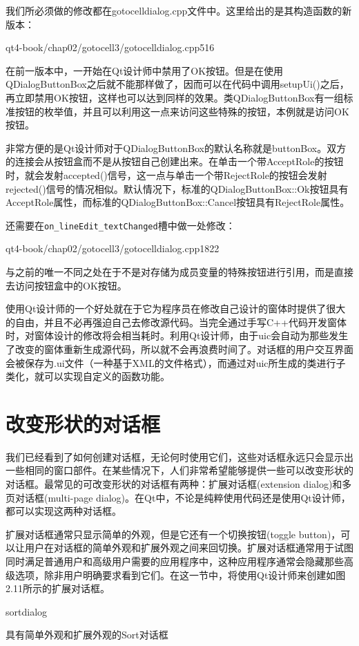 \documentclass[11pt,oneside]{book}
\begin{document}
\begin{common-format}
我们所必须做的修改都在gotocelldialog.cpp文件中。这里给出的是其构造函数的新版本：
\begin{cppline}[3]{qt4-book/chap02/gotocell3/gotocelldialog.cpp}{5}{16}
\end{cppline}

在前一版本中，一开始在Qt设计师中禁用了OK按钮。但是在使用QDialogButtonBox之后就不能那样做了，因而可以在代码中调用setupUi()之后，再立即禁用OK按钮，这样也可以达到同样的效果。类QDialogButtonBox有一组标准按钮的枚举值，并且可以利用这一点来访问这些特殊的按钮，本例就是访问OK按钮。

非常方便的是Qt设计师对于QDialogButtonBox的默认名称就是buttonBox。双方的连接会从按钮盒而不是从按钮自己创建出来。在单击一个带AcceptRole的按钮时，就会发射accepted()信号，这一点与单击一个带RejectRole的按钮会发射rejected()信号的情况相似。默认情况下，标准的QDialogButtonBox::Ok按钮具有AcceptRole属性，而标准的QDialogButtonBox::Cancel按钮具有RejectRole属性。

还需要在\verb+on_lineEdit_textChanged+槽中做一处修改：
\begin{cppline}[13]{qt4-book/chap02/gotocell3/gotocelldialog.cpp}{18}{22}
\end{cppline}

与之前的唯一不同之处在于不是对存储为成员变量的特殊按钮进行引用，而是直接去访问按钮盒中的OK按钮。

使用Qt设计师的一个好处就在于它为程序员在修改自己设计的窗体时提供了很大的自由，并且不必再强迫自己去修改源代码。当完全通过手写C++代码开发窗体时，对窗体设计的修改将会相当耗时。利用Qt设计师，由于uic会自动为那些发生了改变的窗体重新生成源代码，所以就不会再浪费时间了。对话框的用户交互界面会被保存为.ui文件（一种基于XML的文件格式），而通过对uic所生成的类进行子类化，就可以实现自定义的函数功能。

\section{改变形状的对话框}
我们已经看到了如何创建对话框，无论何时使用它们，这些对话框永远只会显示出一些相同的窗口部件。在某些情况下，人们非常希望能够提供一些可以改变形状的对话框。最常见的可改变形状的对话框有两种：扩展对话框(extension dialog)和多页对话框(multi-page dialog)。在Qt中，不论是纯粹使用代码还是使用Qt设计师，都可以实现这两种对话框。

扩展对话框通常只显示简单的外观，但是它还有一个切换按钮(toggle button)，可以让用户在对话框的简单外观和扩展外观之间来回切换。扩展对话框通常用于试图同时满足普通用户和高级用户需要的应用程序中，这种应用程序通常会隐藏那些高级选项，除非用户明确要求看到它们。在这一节中，将使用Qt设计师来创建如图2.11所示的扩展对话框。
\begin{linefig}[0.8]{sortdialog}
\caption{具有简单外观和扩展外观的Sort对话框}
\label{fig:sortdialog}
\end{linefig}


\end{common-format}
\end{document}
